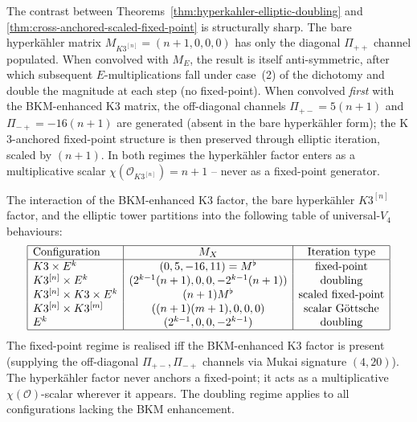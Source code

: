 \begin{remark}
\label{rem:hyperkahler-multiplicative-absorber}
The contrast between
Theorems~\ref{thm:hyperkahler-elliptic-doubling}
and \ref{thm:cross-anchored-scaled-fixed-point} is structurally
sharp. The bare hyperk\"ahler matrix
$M_{K3^{[n]}} = (n + 1, 0, 0, 0)$ has only the diagonal $\Pi_{++}$
channel populated. When convolved with $M_E$, the result is
itself anti-symmetric, after which subsequent $E$-multiplications
fall under case~(2) of the dichotomy and double the magnitude at each
step \textup{(}no fixed-point\textup{).} When convolved \emph{first}
with the BKM-enhanced K$3$ matrix, the off-diagonal channels
$\Pi_{+-} = 5 (n + 1)$ and $\Pi_{-+} = -16 (n + 1)$ are generated
\textup{(}absent in the bare hyperk\"ahler form\textup{);} the
K$3$-anchored fixed-point structure is then preserved through
elliptic iteration, scaled by $(n + 1)$. In both regimes the
hyperk\"ahler factor enters as a multiplicative scalar
$\chi(\mathcal{O}_{K3^{[n]}}) = n + 1$ -- never as a fixed-point
generator.
\end{remark}

\begin{remark}
\label{rem:hk-elliptic-regimes-table}
The interaction of the BKM-enhanced K$3$ factor, the bare
hyperk\"ahler $K3^{[n]}$ factor, and the elliptic tower partitions
into the following table of universal-$V_4$ behaviours:
\[
\begin{array}{|l|c|c|}
\hline
\text{Configuration} & M_X & \text{Iteration type} \\
\hline
K3 \times E^k & (0, 5, -16, 11) = M^\flat & \text{fixed-point} \\
K3^{[n]} \times E^k & (2^{k - 1}(n + 1), 0, 0, -2^{k - 1}(n + 1)) & \text{doubling} \\
K3^{[n]} \times K3 \times E^k & (n + 1) M^\flat & \text{scaled fixed-point} \\
K3^{[n]} \times K3^{[m]} & ((n + 1)(m + 1), 0, 0, 0) & \text{scalar G\"ottsche} \\
E^k & (2^{k - 1}, 0, 0, -2^{k - 1}) & \text{doubling} \\
\hline
\end{array}
\]
The fixed-point regime is realised iff the BKM-enhanced K$3$
factor is present
\textup{(}supplying the off-diagonal $\Pi_{+-}, \Pi_{-+}$
channels via Mukai signature $(4, 20)$\textup{).} The hyperk\"ahler
factor never anchors a fixed-point; it acts as a multiplicative
$\chi(\mathcal{O})$-scalar wherever it appears. The doubling regime
applies to all configurations lacking the BKM enhancement.
\end{remark}

